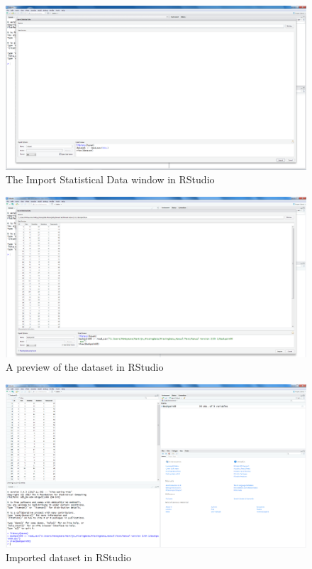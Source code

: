 \documentclass[]{book}
\theoremstyle{definition}
\theoremstyle{definition}
\theoremstyle{definition}
\theoremstyle{remark}
\begin{document}
\begin{figure}

{\centering \includegraphics[width=0.9\linewidth]{images/fig1.15} 

}

\caption{The Import Statistical Data window in RStudio}\label{fig:fig15}
\end{figure}

\begin{figure}

{\centering \includegraphics[width=0.9\linewidth]{images/fig1.16} 

}

\caption{A preview of the dataset in RStudio}\label{fig:fig16}
\end{figure}

\begin{figure}

{\centering \includegraphics[width=0.9\linewidth]{images/fig1.17} 

}

\caption{Imported dataset in RStudio}\label{fig:fig17}
\end{figure}
\end{document}
